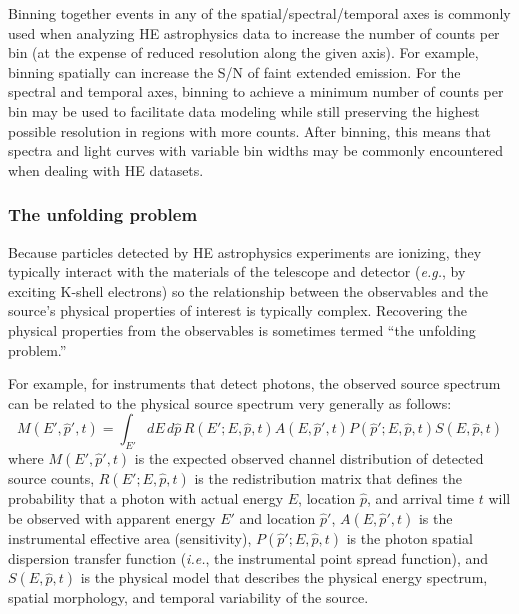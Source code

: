\documentclass[11pt,a4paper]{ivoa}
\begin{document}
Binning together events in any of the spatial/spectral/temporal axes is commonly used when analyzing \gls{HE} astrophysics data to increase the number of counts per bin (at the expense of reduced resolution along the given axis).  For example, binning spatially can increase the S/N of faint extended emission.  For the spectral and temporal axes, binning to achieve a minimum number of counts per bin may be used  to facilitate data modeling while still preserving the highest possible resolution in regions with more counts.  After binning, this means that  spectra and light curves with variable bin widths may be commonly encountered when dealing with \gls{HE} datasets.

\subsubsection{The unfolding problem}


Because particles detected by \gls{HE} astrophysics experiments are ionizing, they typically interact with the materials of the telescope and detector ({\em e.g.\/}, by exciting K-shell electrons) so the relationship between the observables and the source's physical properties of interest is typically complex.  Recovering the physical properties from the observables is sometimes termed ``the unfolding problem.''

For example, for instruments that detect photons, the observed source spectrum can be related to the physical source spectrum very generally as follows:
\begin{equation}\label{eqn:phaspec}
M(E', \hat{p}', t) = \int_{E'} dE\, d\hat{p}\, R(E'; E, \hat{p}, t) A(E, \hat{p}', t) P(\hat{p}'; E, \hat{p}, t) S(E, \hat{p}, t)
\end{equation}
where $M(E', \hat{p}', t)$ is the expected observed channel distribution of detected source counts, $R(E'; E, \hat{p}, t)$ is the redistribution matrix that defines the probability that a photon with actual energy $E$, location $\hat{p}$, and arrival time $t$ will be observed with apparent energy $E'$ and location $\hat{p}'$, $A(E, \hat{p}', t)$ is the instrumental effective area (sensitivity), $P(\hat{p}'; E, \hat{p}, t)$ is the photon spatial dispersion transfer function ({\em i.e.\/}, the instrumental point spread function), and  $S(E, \hat{p}, t)$ is the physical model that describes the physical energy spectrum, spatial morphology, and temporal variability of the source.
\end{document}
